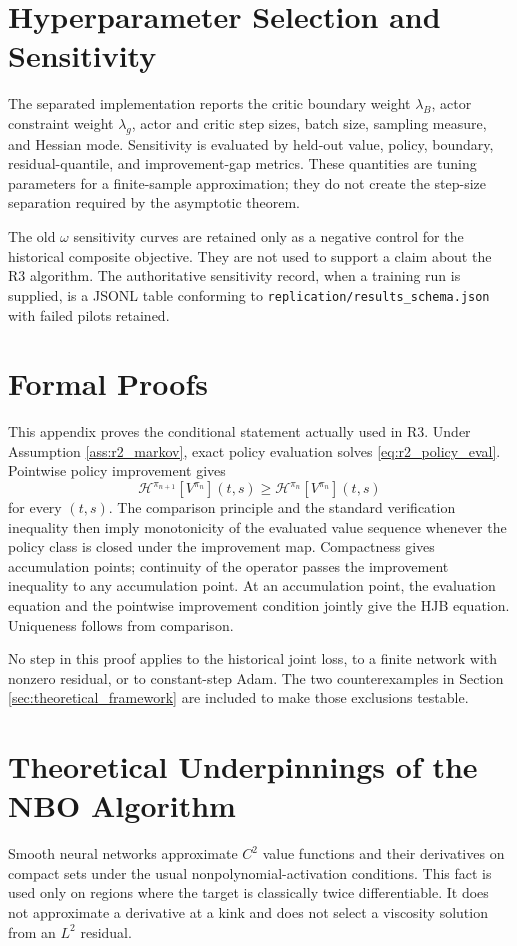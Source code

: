 \documentclass[ecta]{econsocart}
\theoremstyle{plain}
\theoremstyle{remark}
\begin{document}
\begin{appendix}
\section{Hyperparameter Selection and Sensitivity}
The separated implementation reports the critic boundary weight $\lambda_B$, actor constraint weight $\lambda_g$, actor and critic step sizes, batch size, sampling measure, and Hessian mode. Sensitivity is evaluated by held-out value, policy, boundary, residual-quantile, and improvement-gap metrics. These quantities are tuning parameters for a finite-sample approximation; they do not create the step-size separation required by the asymptotic theorem.

The old $\omega$ sensitivity curves are retained only as a negative control for the historical composite objective. They are not used to support a claim about the R3 algorithm. The authoritative sensitivity record, when a training run is supplied, is a JSONL table conforming to \texttt{replication/results\_schema.json} with failed pilots retained.

\section{Formal Proofs}
\label{app:proofs}
This appendix proves the conditional statement actually used in R3. Under Assumption \ref{ass:r2_markov}, exact policy evaluation solves \eqref{eq:r2_policy_eval}. Pointwise policy improvement gives
\[
\mathcal H^{\pi_{n+1}}[V^{\pi_n}](t,s)\geq \mathcal H^{\pi_n}[V^{\pi_n}](t,s)
\]
for every $(t,s)$. The comparison principle and the standard verification inequality then imply monotonicity of the evaluated value sequence whenever the policy class is closed under the improvement map. Compactness gives accumulation points; continuity of the operator passes the improvement inequality to any accumulation point. At an accumulation point, the evaluation equation and the pointwise improvement condition jointly give the HJB equation. Uniqueness follows from comparison.

No step in this proof applies to the historical joint loss, to a finite network with nonzero residual, or to constant-step Adam. The two counterexamples in Section \ref{sec:theoretical_framework} are included to make those exclusions testable.

\section{Theoretical Underpinnings of the NBO Algorithm}
\label{app:uat_conv}
Smooth neural networks approximate $C^2$ value functions and their derivatives on compact sets under the usual nonpolynomial-activation conditions. This fact is used only on regions where the target is classically twice differentiable. It does not approximate a derivative at a kink and does not select a viscosity solution from an $L^2$ residual.


\end{appendix}
\end{document}
